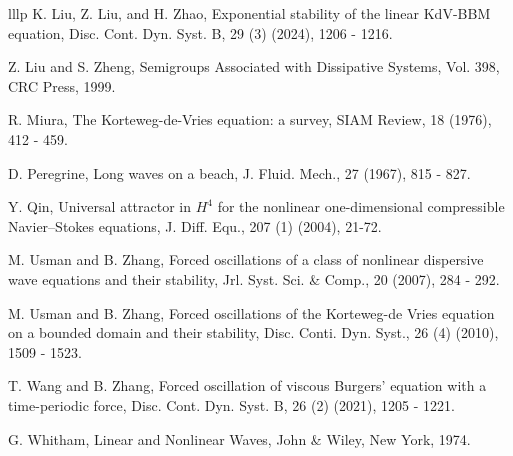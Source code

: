 \documentclass[10pt,a4paper,final]{article}
\numberwithin{equation}{section}
\begin{document}
\begin{thebibliography}{lllp}
 K. Liu, Z. Liu, and H. Zhao, Exponential stability of the linear KdV-BBM equation, Disc. Cont. Dyn. Syst. B, 29 (3) (2024), 1206 - 1216.

 Z. Liu and S. Zheng, Semigroups Associated with Dissipative Systems, Vol. 398, CRC Press, 1999.


 R. Miura, The Korteweg-de-Vries equation: a survey, SIAM Review, 18 (1976), 412 - 459. 

 D. Peregrine, Long waves on a beach, J. Fluid. Mech., 27 (1967), 815 - 827. 

 Y. Qin, Universal attractor in 
$H^4$ for the nonlinear one-dimensional compressible Navier–Stokes equations, J. Diff. Equ., 207 (1) (2004), 21-72. 

 M. Usman and B. Zhang, Forced oscillations of a class of nonlinear dispersive wave equations and their stability, Jrl. Syst. Sci. \& Comp., 20 (2007), 284 - 292.

 M. Usman and B. Zhang, Forced oscillations of the Korteweg-de Vries equation on a bounded domain and their stability, Disc. Conti. Dyn. Syst., 26 (4) (2010), 1509 - 1523.

 T. Wang and B. Zhang, Forced oscillation of viscous Burgers' equation with a time-periodic force, Disc. Cont. Dyn. Syst. B, 26 (2) (2021), 1205 - 1221.

 G. Whitham, Linear and Nonlinear Waves, John \& Wiley, New York, 1974.  

\end{thebibliography}
\end{document}
